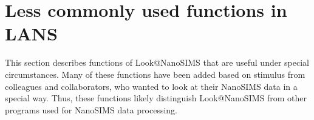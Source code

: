 \documentclass[a4paper, 11pt]{article}
\newcounter{step}
\begin{document}
\newpage


%
%
%
%
%
%
%

\section{Less commonly used functions in LANS}
\label{sec:level3}

This section describes functions of Look@NanoSIMS that are useful under special circumstances. Many of these functions have been added based on stimulus from colleagues and collaborators, who wanted to look at their NanoSIMS data in a special way. Thus, these functions likely distinguish Look@NanoSIMS from other programs used for NanoSIMS data processing.


%
%

\end{document}
